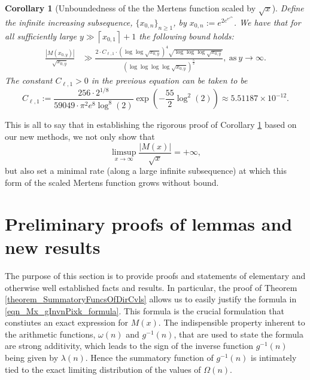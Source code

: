 \documentclass[11pt,reqno,a4letter]{article}
\numberwithin{figure}{section}
\numberwithin{table}{section}
\newcommand{\floor}[1]{\left\lfloor #1 \right\rfloor}
\newcommand{\ceiling}[1]{\left\lceil #1 \right\rceil}
\theoremstyle{plain}
\newtheorem{cor}[theorem]{Corollary}
\numberwithin{theorem}{section}
\theoremstyle{definition}
\newcommand{\SuccSim}[0]{\overset{_{\scriptsize{\blacktriangle}}}{\succsim}}
\renewcommand{\SuccSim}[0]{\ensuremath{\gg}}
\begin{document}
\begin{cor}[Unboundedness of the the Mertens function scaled by $\sqrt{x}$] 
\label{cor_ThePipeDreamResult_v1} 
Define the infinite increasing subsequence, 
$\{x_{0,n}\}_{n \geq 1}$, by $x_{0,n} := e^{2e^{e^{e^{2n}}}}$. 
We have that for all sufficiently large 
$y \gg \ceiling{x_{0,1}}+1$ the following bound holds: 
\begin{align*} 
\frac{|M(x_{0,y})|}{\sqrt{x_{0,y}}} & \SuccSim 
     \frac{2 \cdot C_{\ell, 1} \cdot (\log\log \sqrt{x_{0,y}})^{4} \sqrt{\log\log\log \sqrt{x_{0,y}}}}{ 
     (\log\log\log\log \sqrt{x_{0,y}})^{\frac{5}{2}}}, \mathrm{\ as\ } y \rightarrow \infty. 
\end{align*} 
The constant $C_{\ell,1} > 0$ in the previous equation can be taken to be 
\[
C_{\ell,1} := 
     \frac{256 \cdot 2^{1/8}}{59049 \cdot \pi^2 e^8 \log^8(2)} 
     \exp\left(-\frac{55}{2} \log^2(2)\right) 
     \approx 5.51187 \times 10^{-12}. 
\]
\end{cor} 

This is all to say that in establishing the rigorous proof of 
Corollary \ref{cor_ThePipeDreamResult_v1} 
based on our new methods, we not only show that 
\[
\limsup_{x \rightarrow \infty} \frac{|M(x)|}{\sqrt{x}} = +\infty, 
\]
but also set a minimal rate (along a large infinite subsequence) at which this form of the 
scaled Mertens function grows without bound. 


\newpage 
\section{Preliminary proofs of lemmas and new results} 
\label{Section_PrelimProofs_Config} 

The purpose of this section is to provide proofs and statements 
of elementary and otherwise well established facts and results. In particular, the proof of 
Theorem \ref{theorem_SummatoryFuncsOfDirCvls} allows us to easily justify the formula in 
\eqref{eqn_Mx_gInvnPixk_formula}. 
This formula is the crucial formulation that constiutes an exact expression for $M(x)$. 
The indispensible property inherent to the arithmetic functions, $\omega(n)$ and $g^{-1}(n)$, 
that are used to state the formula are strong additivity, which leads to the sign of the inverse function 
$g^{-1}(n)$ being given by $\lambda(n)$. Hence the summatory function of $g^{-1}(n)$ is 
intimately tied to the exact limiting 
distribution of the values of $\Omega(n)$. 
\end{document}

